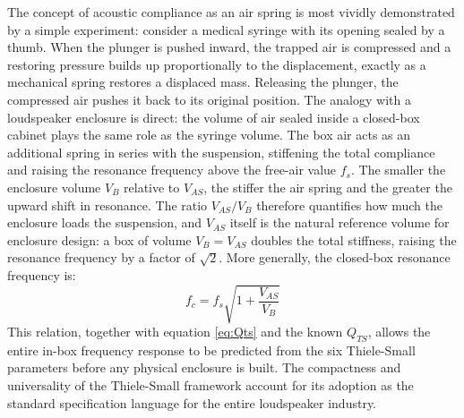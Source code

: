 The concept of acoustic compliance as an air spring is most vividly demonstrated by a simple experiment: consider a medical syringe with its opening sealed by a thumb.
When the plunger is pushed inward, the trapped air is compressed and a restoring pressure builds up proportionally to the displacement, exactly as a mechanical spring restores a displaced mass.
Releasing the plunger, the compressed air pushes it back to its original position.
The analogy with a loudspeaker enclosure is direct: the volume of air sealed inside a closed-box cabinet plays the same role as the syringe volume.
The box air acts as an additional spring in series with the suspension, stiffening the total compliance and raising the resonance frequency above the free-air value \(f_s\).
The smaller the enclosure volume \(V_B\) relative to \(V_{AS}\), the stiffer the air spring and the greater the upward shift in resonance.
The ratio \(V_{AS}/V_B\) therefore quantifies how much the enclosure loads the suspension, and \(V_{AS}\) itself is the natural reference volume for enclosure design: a box of volume \(V_B = V_{AS}\) doubles the total stiffness, raising the resonance frequency by a factor of \(\sqrt{2}\).
More generally, the closed-box resonance frequency is:
\[
f_c = f_s \sqrt{1 + \frac{V_{AS}}{V_B}}
\]
This relation, together with equation \eqref{eq:Qts} and the known \(Q_{TS}\), allows the entire in-box frequency response to be predicted from the six Thiele-Small parameters before any physical enclosure is built.
The compactness and universality of the Thiele-Small framework account for its adoption as the standard specification language for the entire loudspeaker industry.
